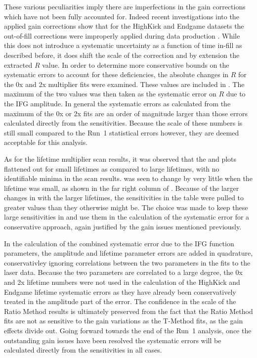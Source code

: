 These various peculiarities imply there are imperfections in the gain corrections which have not been fully accounted for. Indeed recent investigations into the applied gain corrections show that for the HighKick and Endgame datasets the out-of-fill corrections were improperly applied during data production \cite{GainOscEndgameHighKick}. While this does not introduce a systematic uncertainty as a function of time in-fill as described before, it does shift the scale of the correction and by extension the extracted $R$ value. In order to determine more conservative bounds on the systematic errors to account for these deficiencies, the absolute changes in $R$ for the 0x and 2x multiplier fits were examined. These values are included in . The maximum of the two values was then taken as the systematic error on $R$ due to the IFG amplitude. In general the systematic errors as calculated from the maximum of the 0x or 2x fits are an order of magnitude larger than those errors calculated directly from the sensitivities. Because the scale of these numbers is still small compared to the Run~1 statistical errors however, they are deemed acceptable for this analysis. 

As for the lifetime multiplier scan results, it was observed that the \R and \chisq plots flattened out for small lifetimes as compared to large lifetimes, with no identifiable minima in the scan results. \R was seen to change by very little when the lifetime was small, as shown in the far right column of . Because of the larger changes in \R with the larger lifetimes, the sensitivities in the table were pulled to greater values than they otherwise might be. The choice was made to keep these large sensitivities in and use them in the calculation of the systematic error for a conservative approach, again justified by the gain issues mentioned previously.

In the calculation of the combined systematic error due to the IFG function parameters, the amplitude and lifetime parameter errors are added in quadrature, conservativley ignoring correlations between the two parameters in the fits to the laser data. Because the two parameters are correlated to a large degree, the 0x and 2x lifetime numbers were not used in the calculation of the HighKick and Endgame lifetime systematic errors as they have already been conservatively treated in the amplitude part of the error. The confidence in the scale of the Ratio Method results is ultimately preserved from the fact that the Ratio Method fits are not as sensitive to the gain variations as the T-Method fits, as the gain effects divide out. Going forward towards the end of the Run~1 analysis, once the outstanding gain issues have been resolved the systematic errors will be calculated directly from the sensitivities in all cases.


